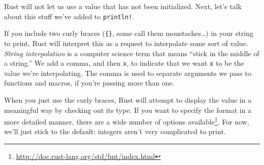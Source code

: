 \documentclass[a4paper,]{book}
\newenvironment{Shaded}{\begin{snugshade}}{\end{snugshade}}
\newcommand{\KeywordTok}[1]{\textcolor[rgb]{0.13,0.29,0.53}{\textbf{{#1}}}}
\newcommand{\StringTok}[1]{\textcolor[rgb]{0.31,0.60,0.02}{{#1}}}
\newcommand{\NormalTok}[1]{{#1}}
\renewcommand{\href}[2]{#2\footnote{\url{#1}}}
\begin{document}
\begin{Shaded}
\end{Shaded}

Rust will not let us use a value that has not been initialized. Next,
let's talk about this stuff we've added to \texttt{println!}.

If you include two curly braces (\texttt{\{\}}, some call them
moustaches\ldots{}) in your string to print, Rust will interpret this as
a request to interpolate some sort of value. \emph{String interpolation}
is a computer science term that means ``stick in the middle of a
string.'' We add a comma, and then \texttt{x}, to indicate that we want
\texttt{x} to be the value we're interpolating. The comma is used to
separate arguments we pass to functions and macros, if you're passing
more than one.

When you just use the curly braces, Rust will attempt to display the
value in a meaningful way by checking out its type. If you want to
specify the format in a more detailed manner, there are a
\href{http://doc.rust-lang.org/std/fmt/index.html}{wide number of
options available}. For now, we'll just stick to the default: integers
aren't very complicated to print.

\end{document}
